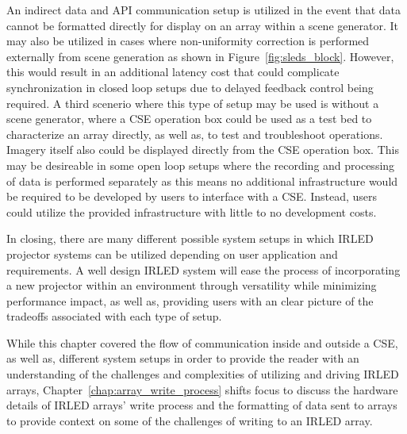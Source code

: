         An indirect data and API communication setup is utilized in the event that data cannot be formatted directly for display on an array within a scene generator. It may also be utilized in cases where non-uniformity correction is performed externally from scene generation as shown in Figure~\ref{fig:sleds_block}. However, this would result in an additional latency cost that could complicate synchronization in closed loop setups due to delayed feedback control being required. A third scenerio where this type of setup may be used is without a scene generator, where a CSE operation box could be used as a test bed to characterize an array directly, as well as, to test and troubleshoot operations. Imagery itself also could be displayed directly from the CSE operation box. This may be desireable in some open loop setups where the recording and processing of data is performed separately as this means no additional infrastructure would be required to be developed by users to interface with a CSE. Instead, users could utilize the provided infrastructure with little to no development costs.

        In closing, there are many different possible system setups in which IRLED projector systems can be utilized depending on user application and requirements. A well design IRLED system will ease the process of incorporating a new projector within an environment through versatility while minimizing performance impact, as well as, providing users with an clear picture of the tradeoffs associated with each type of setup.

        While this chapter covered the flow of communication inside and outside a CSE, as well as, different system setups in order to provide the reader with an understanding of the challenges and complexities of utilizing and driving IRLED arrays, Chapter~\ref{chap:array_write_process} shifts focus to discuss the hardware details of IRLED arrays' write process and the formatting of data sent to arrays to provide context on some of the challenges of writing to an IRLED array.
